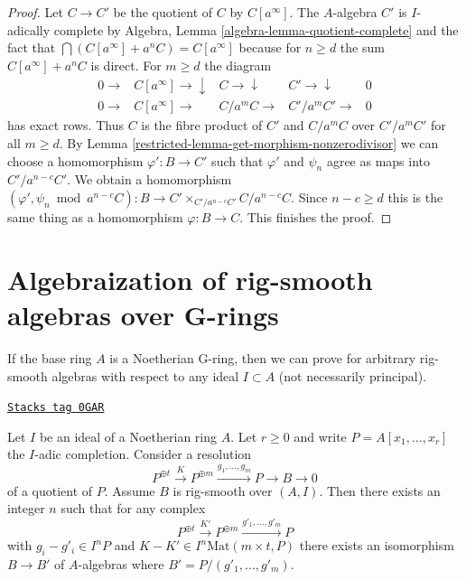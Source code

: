 \begin{proof}

Let $C \to C'$ be the quotient of $C$ by $C[a^\infty]$. The $A$-algebra
$C'$ is $I$-adically complete by
Algebra, Lemma \ref{algebra-lemma-quotient-complete}
and the fact that $\bigcap (C[a^\infty] + a^nC) = C[a^\infty]$
because for $n \geq d$ the sum $C[a^\infty] + a^nC$ is direct.
For $m \geq d$ the diagram
$$
\begin{array}{ccccc}0 \longrightarrow & C[a^\infty] \longrightarrow\downarrow & C \longrightarrow\downarrow & C' \longrightarrow\downarrow & 0 \\ 0 \longrightarrow & C[a^\infty] \longrightarrow & C/a^m C \longrightarrow & C'/a^m C' \longrightarrow & 0\end{array}
$$
has exact rows. Thus $C$ is the fibre product of $C'$ and
$C/a^mC$ over $C'/a^mC'$ for all $m \geq d$. By
Lemma \ref{restricted-lemma-get-morphism-nonzerodivisor}
we can choose a homomorphism $\varphi' : B \to C'$
such that $\varphi'$ and $\psi_n$ agree as maps into $C'/a^{n - c}C'$.
We obtain a homomorphism $(\varphi', \psi_n \bmod a^{n - c}C) : B \to
C' \times_{C'/a^{n - c}C'} C/a^{n - c}C$.
Since $n - c \geq d$ this is the same thing as a homomorphism
$\varphi : B \to C$. This finishes the proof.
\end{proof}

\section{Algebraization of rig-smooth algebras over G-rings}
\label{restricted-section-over-G-ring}
If the base ring $A$ is a Noetherian G-ring, then we can
prove \cite[III Theorem 7]{Elkik} for arbitrary rig-smooth
algebras with respect to any ideal $I \subset A$ (not necessarily
principal).

\begin{lemma}
\label{restricted-lemma-close-enough}
\href{https://stacks.math.columbia.edu/tag/0GAR}{\texttt{Stacks tag 0GAR}}

Let $I$ be an ideal of a Noetherian ring $A$. Let $r \geq 0$
and write $P = A[x_1, \ldots, x_r]$ the $I$-adic completion.
Consider a resolution
$$
P^{\oplus t} \xrightarrow{K} P^{\oplus m}
\xrightarrow{g_1, \ldots, g_m} P \to B \to 0
$$
of a quotient of $P$. Assume $B$ is rig-smooth over $(A, I)$.
Then there exists an integer $n$ such that for any complex
$$
P^{\oplus t} \xrightarrow{K'} P^{\oplus m}
\xrightarrow{g'_1, \ldots, g'_m} P
$$
with $g_i - g'_i \in I^nP$ and $K - K' \in I^n\text{Mat}(m \times t, P)$
there exists an isomorphism $B \to B'$ of $A$-algebras where
$B' = P/(g'_1, \ldots, g'_m)$.
\end{lemma}

